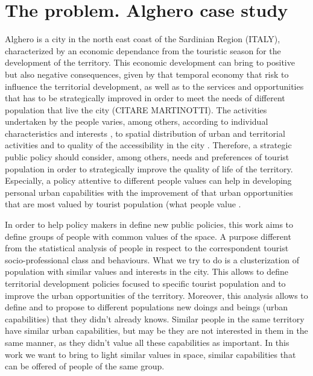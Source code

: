 \documentclass[a4paper]{article}
\begin{document}
\section{The problem. Alghero case study}
 Alghero is a city in the north east coast of the Sardinian Region (ITALY), characterized by an economic dependance from the touristic season for the development of the territory. This economic development can bring to positive but also negative consequences, given by that temporal economy that risk to influence the territorial development, as well as to the services and opportunities that has to be strategically improved in order to meet the needs of different population that live the city (CITARE MARTINOTTI). The activities undertaken by the people varies, among others, according to individual characteristics and interests \cite{Kellner2016}, to spatial distribution of urban and territorial activities and to quality of the accessibility in the city \cite{Blecic2015a}.
Therefore, a strategic public policy should consider, among others, needs and preferences of tourist population in order to strategically improve the quality of life of the territory. Especially, a policy attentive to different people values can help in developing personal urban capabilities with the improvement of that urban opportunities that are most valued by tourist population (what people value \cite{Sen1999}.

 In order to help policy makers in define new public policies, this work  aims to define groups of people with common values of the space. A purpose different from the statistical analysis of people in respect to the correspondent tourist socio-professional class and behaviours. What we try to do is a clusterization of population with similar values and interests in the city. This allows to define territorial development policies focused to specific tourist population and to improve the urban opportunities of the territory. Moreover, this analysis allows to define and to propose to different populations new doings and beings (urban capabilities) that they didn't already knows. Similar people in the same territory have similar urban capabilities, but may be they are not interested in them in the same manner, as they didn't value all these capabilities as important. In this work we want to bring to light similar values in space, similar capabilities that can be offered of people of the same group.
\end{document}
